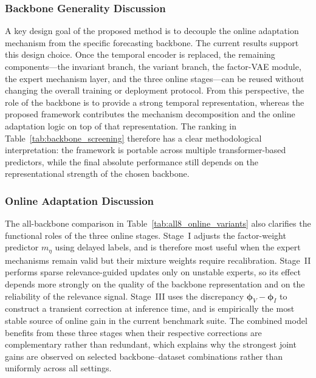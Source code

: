 ﻿\documentclass[journal]{IEEEtran}
\newenvironment{auditproblemblock}{\begingroup\color{red}}{\endgroup}
\begin{document}
\begin{auditproblemblock}
\subsubsection{Backbone Generality Discussion}
A key design goal of the proposed method is to decouple the online adaptation mechanism from the specific forecasting backbone. The current results support this design choice. Once the temporal encoder is replaced, the remaining components---the invariant branch, the variant branch, the factor-VAE module, the expert mechanism layer, and the three online stages---can be reused without changing the overall training or deployment protocol. From this perspective, the role of the backbone is to provide a strong temporal representation, whereas the proposed framework contributes the mechanism decomposition and the online adaptation logic on top of that representation. The ranking in Table~\ref{tab:backbone_screening} therefore has a clear methodological interpretation: the framework is portable across multiple transformer-based predictors, while the final absolute performance still depends on the representational strength of the chosen backbone.

\subsubsection{Online Adaptation Discussion}
The all-backbone comparison in Table~\ref{tab:all8_online_variants} also clarifies the functional roles of the three online stages. Stage~I adjusts the factor-weight predictor $m_{\eta}$ using delayed labels, and is therefore most useful when the expert mechanisms remain valid but their mixture weights require recalibration. Stage~II performs sparse relevance-guided updates only on unstable experts, so its effect depends more strongly on the quality of the backbone representation and on the reliability of the relevance signal. Stage~III uses the discrepancy $\boldsymbol{\phi}_V-\boldsymbol{\phi}_I$ to construct a transient correction at inference time, and is empirically the most stable source of online gain in the current benchmark suite. The combined model benefits from these three stages when their respective corrections are complementary rather than redundant, which explains why the strongest joint gains are observed on selected backbone--dataset combinations rather than uniformly across all settings.


\end{auditproblemblock}
\end{document}
